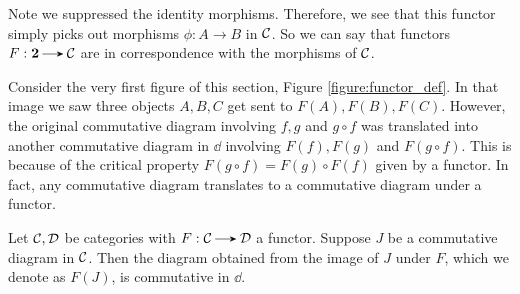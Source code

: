 \begin{example}
\begin{center}
        \end{center}
        Note we suppressed the identity morphisms. 
        Therefore, we see that this functor simply picks out morphisms $\phi: A \to B$ in $\mathcal{C}$. 
        So we can say that functors $F: \bm{2} \to \cc$ are in correspondence with the 
        morphisms of $\mathcal{C}$. 
    \end{example}

    Consider the very first figure of this section, Figure \ref{figure:functor_def}.
    In that image we saw three objects $A,B,C$ get sent to $F(A),F(B),F(C)$. However, the 
    original commutative diagram involving $f, g$ and $g \circ f$ was translated into another 
    commutative diagram in $\dd$ involving $F(f), F(g)$ and $F(g \circ f)$. 
    This is because of the critical property $F(g \circ f) = F(g) \circ F(f)$ 
    given by a functor. In fact, any commutative diagram translates to a commutative 
    diagram under a functor. 

    \begin{proposition}
        Let $\mathcal{C}, \mathcal{D}$ be categories with $F: \cc \to \dd$ a functor. 
        Suppose $J$ be a commutative diagram in $\mathcal{C}$. Then the diagram obtained 
        from the image of  
        $J$ under $F$, which we denote as $F(J)$, is commutative in $\dd$.
    \end{proposition}

